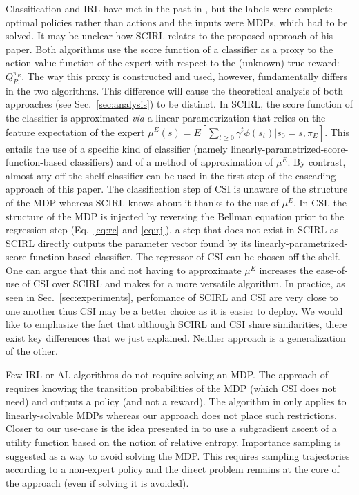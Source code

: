 \documentclass{llncs}
\begin{document}
Classification and IRL have met in the past in \cite{ratliff2006maximum}, but the labels were complete optimal policies rather than actions and the inputs were MDPs, which had to be solved. It may be unclear how SCIRL \cite{klein2012scirl} relates to the proposed approach of his paper. Both algorithms use the score function of a classifier as a proxy to the action-value function of the expert with respect to the (unknown) true reward: $Q^{\pi_E}_R$. The way this proxy is constructed and used, however, fundamentally differs in the two algorithms. This difference will cause the theoretical analysis of both approaches (see Sec.~\ref{sec:analysis}) to be distinct. In SCIRL, the score function of the classifier is approximated {\it via} a linear parametrization that relies on the feature expectation of the expert $\mu^E(s) = E[\sum_{t\geq 0}\gamma^t\phi(s_t)|s_0=s,\pi_E]$. This entails the use of a specific kind of classifier (namely linearly-parametrized-score-function-based classifiers) and of a method of approximation of $\mu^E$. By contrast, almost any off-the-shelf classifier can be used in the first step of the cascading approach of this paper. The classification step of CSI is unaware of the structure of the MDP whereas SCIRL knows about it thanks to the use of $\mu^E$. In CSI, the structure of the MDP is injected by reversing the Bellman equation prior to the regression step (Eq.~\ref{eq:rc} and \eqref{eq:rj}), a step that does not exist in SCIRL as SCIRL directly outputs the parameter vector found by its linearly-parametrized-score-function-based classifier. The regressor of CSI can be chosen off-the-shelf. One can argue that this and not having to approximate $\mu^E$ increases the ease-of-use of CSI over SCIRL and makes for a more versatile algorithm. In practice, as seen in Sec.~\ref{sec:experiments}, perfomance of SCIRL and CSI are very close to one another thus CSI may be a better choice as it is easier to deploy. We would like to emphasize the fact that although SCIRL and CSI share similarities, there exist key differences that we just explained. Neither approach is a generalization of the other.

Few IRL or AL algorithms do not require solving an MDP. The approach of \cite{syed2008apprenticeship} requires knowing the transition probabilities of the MDP (which CSI does not need) and outputs a policy (and not a reward). The algorithm in \cite{dvijotham2010inverse} only applies to linearly-solvable MDPs whereas our approach does not place such restrictions. Closer to our use-case is the idea presented in \cite{boularias2011relative} to use a subgradient ascent of a utility function based on the notion of relative entropy. Importance sampling is suggested as a way to avoid solving the MDP. This requires sampling trajectories according to a non-expert policy and
the direct problem remains at the core of the approach (even if
solving it is avoided).
\end{document}
